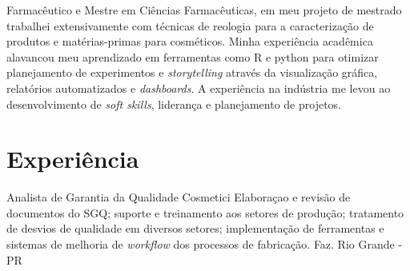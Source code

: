 
\begin{center}
    \small
        Farmacêutico e Mestre em Ciências Farmacêuticas, em meu projeto de mestrado trabalhei extensivamente com técnicas
        de reologia para a caracterização de produtos e matérias-primas para cosméticos.
        Minha experiência acadêmica alavancou meu aprendizado em ferramentas como R e python para otimizar planejamento
        de experimentos e \emph{storytelling} através da visualização gráfica, relatórios automatizados e \emph{dashboards}.
        A experiência na indústria me levou ao desenvolvimento de \emph{soft skills}, liderança e planejamento de projetos.
\end{center}
    
\section{Experiência}



{Analista de Garantia da Qualidade}
{Cosmetici}
{
    Elaboraçao e revisão de documentos do SGQ;
    suporte e treinamento aos setores de produção;
    tratamento de desvios de qualidade em diversos setores;
    implementação de ferramentas e sistemas de melhoria de \emph{workflow}
    dos processos de fabricação.
}
{Faz. Rio Grande - PR}








